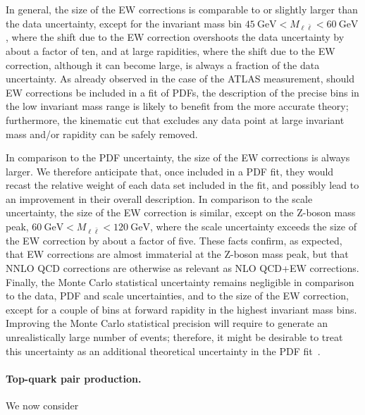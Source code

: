 In general, the size of the EW corrections is comparable to or slightly larger
than the data uncertainty, except for the invariant mass bin 
$\SI{45}{\giga\electronvolt}<M_{\ell\bar\ell}<\SI{60}{\giga\electronvolt}$, where the shift due to the EW correction
overshoots the data uncertainty by about a factor of ten, and at large
rapidities, where the shift due to the EW correction, although it can become
large, is always a fraction of the data uncertainty. As already observed in the
case of the ATLAS measurement, should EW corrections be included in a fit of
PDFs, the description of the precise bins in the low invariant mass range is
likely to benefit from the more accurate theory; furthermore, the kinematic cut
that excludes any data point at large invariant mass and/or rapidity can be
safely removed.

In comparison to the PDF uncertainty, the size of the EW corrections is always
larger. We therefore anticipate that, once included in a PDF fit, they would
recast the relative weight of each data set included in the fit, and possibly
lead to an improvement in their overall description. In comparison to the scale
uncertainty, the size of the EW correction is similar, except on the Z-boson
mass peak, $\SI{60}{\giga\electronvolt}<M_{\ell\bar\ell}<\SI{120}{\giga\electronvolt}$, where the scale uncertainty exceeds
the size of the EW correction by about a factor of five. These facts confirm,
as expected, that EW corrections are almost immaterial at the Z-boson mass
peak, but that NNLO QCD corrections are otherwise as relevant as NLO QCD+EW
corrections. Finally, the Monte Carlo statistical uncertainty remains negligible
in comparison to the data, PDF and scale uncertainties, and to the size of the
EW correction, except for a couple of bins at forward rapidity in the highest
invariant mass bins. Improving the Monte Carlo statistical precision will
require to generate an unrealistically large number of events; therefore, it
might be desirable to treat this uncertainty as an additional theoretical
uncertainty in the PDF fit~\cite{Ball:2018lag}.

\paragraph{Top-quark pair production.} We now consider 


